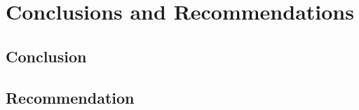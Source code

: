 
\newpage
\section{Conclusions and Recommendations}
\label{Conclusions and Recommendations}

\subsection{Conclusion}

\subsection{Recommendation}
